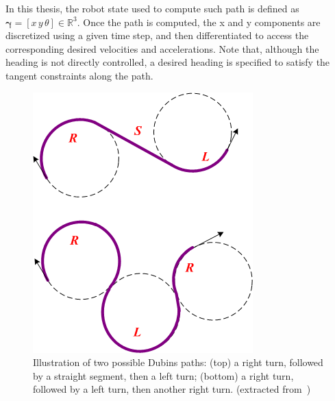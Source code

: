 In this thesis, the robot state used to compute such path is defined as $\boldsymbol{\gamma} = [x \, y \, \theta] \in \mathbb{R}^3$.
Once the path is computed, the x and y components are discretized using a given time step, and then differentiated to access the corresponding desired velocities and accelerations.
Note that, although the heading is not directly controlled, a desired heading is specified to satisfy the tangent constraints along the path.

\begin{figure} [t]
  \centering
  \includegraphics[width=0.4\linewidth]{figures/models/dubins.png} 
  \caption{Illustration of two possible Dubins paths: (top) a right turn, followed by a straight segment, then a left turn; (bottom) a right turn, followed by a left turn, then another right turn. (extracted from~\cite{cFigDubins})}%
  \label{fig:dubins}%
\end{figure}